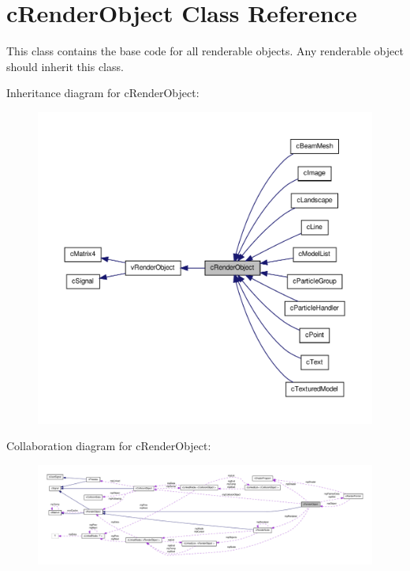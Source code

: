 \hypertarget{classc_render_object}{
\section{cRenderObject Class Reference}
\label{classc_render_object}
}


This class contains the base code for all renderable objects. Any renderable object should inherit this class.  




Inheritance diagram for cRenderObject:
\nopagebreak
\begin{figure}[H]
\begin{center}
\leavevmode
\includegraphics[width=400pt]{classc_render_object__inherit__graph}
\end{center}
\end{figure}


Collaboration diagram for cRenderObject:
\nopagebreak
\begin{figure}[H]
\begin{center}
\leavevmode
\includegraphics[width=400pt]{classc_render_object__coll__graph}
\end{center}
\end{figure}
